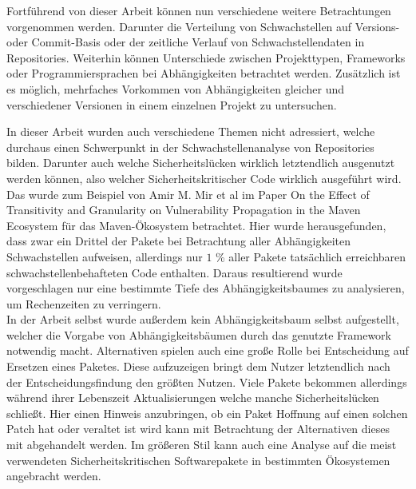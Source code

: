     Fortführend von dieser Arbeit können nun verschiedene weitere Betrachtungen vorgenommen werden.
    Darunter die Verteilung von Schwachstellen auf Versions- oder Commit-Basis oder der zeitliche Verlauf von Schwachstellendaten in Repositories.
    Weiterhin können Unterschiede zwischen Projekttypen, Frameworks oder Programmiersprachen bei Abhängigkeiten betrachtet werden.
    Zusätzlich ist es möglich, mehrfaches Vorkommen von Abhängigkeiten gleicher und verschiedener Versionen in einem einzelnen Projekt zu untersuchen.

    In dieser Arbeit wurden auch verschiedene Themen nicht adressiert, welche durchaus einen Schwerpunkt in der Schwachstellenanalyse von Repositories bilden.
    Darunter auch welche Sicherheitslücken wirklich letztendlich ausgenutzt werden können, also welcher Sicherheitskritischer Code wirklich ausgeführt wird.
    Das wurde zum Beispiel von Amir M. Mir et al im Paper \glqq On the Effect of Transitivity and Granularity on Vulnerability Propagation in the Maven Ecosystem\grqq\textsuperscript{\cite{article:OnTheEffect10123571}} für das Maven-Ökosystem betrachtet.
    Hier wurde herausgefunden, dass zwar ein Drittel der Pakete bei Betrachtung aller Abhängigkeiten Schwachstellen aufweisen, allerdings nur $1$ \% aller Pakete tatsächlich erreichbaren schwachstellenbehafteten Code enthalten.
    Daraus resultierend wurde vorgeschlagen nur eine bestimmte Tiefe des Abhängigkeitsbaumes zu analysieren, um Rechenzeiten zu verringern.
    \\
    In der Arbeit selbst wurde außerdem kein Abhängigkeitsbaum selbst aufgestellt, welcher die Vorgabe von Abhängigkeitsbäumen durch das genutzte Framework notwendig macht.
    Alternativen spielen auch eine große Rolle bei Entscheidung auf Ersetzen eines Paketes.
    Diese aufzuzeigen bringt dem Nutzer letztendlich nach der Entscheidungsfindung den größten Nutzen.
    Viele Pakete bekommen allerdings während ihrer Lebenszeit Aktualisierungen welche manche Sicherheitslücken schließt.
    Hier einen Hinweis anzubringen, ob ein Paket Hoffnung auf einen solchen Patch hat oder veraltet ist wird kann mit Betrachtung der Alternativen dieses mit abgehandelt werden.
    Im größeren Stil kann auch eine Analyse auf die meist verwendeten Sicherheitskritischen Softwarepakete in bestimmten Ökosystemen angebracht werden. 
